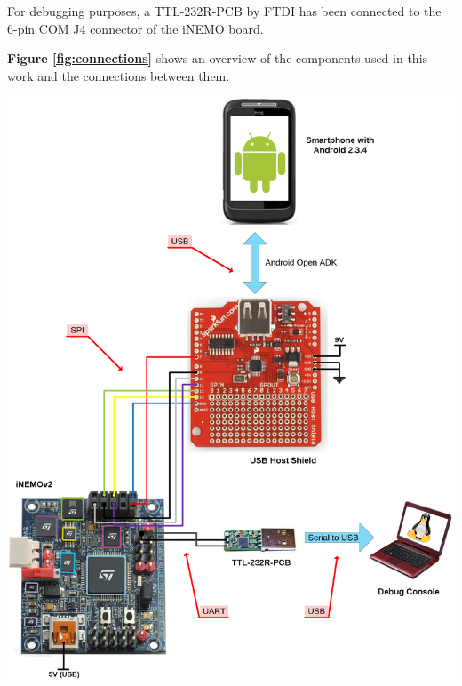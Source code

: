 For debugging purposes, a TTL-232R-PCB by FTDI\cite{ttl232r} has been connected to the 6-pin COM J4 connector of the iNEMO board.

{\bf Figure \ref{fig:connections}} shows an overview of the components used in this work and the connections between them.

\begin{center}
	\includegraphics[width=0.95\linewidth]{pics/connections.eps}
	\label{fig:connections}
\end{center}

